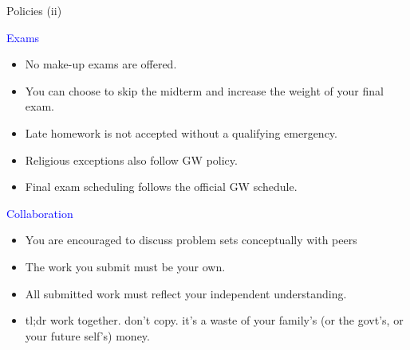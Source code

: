 \documentclass[notes,11pt, aspectratio=169, xcolor=table]{beamer}
\newcommand{\blue}[1]{\textcolor{blue}{#1}}
\newenvironment{wideitemize}{\itemize\addtolength{\itemsep}{10pt}}{\enditemize}
\begin{document}
\begin{frame}{Policies (ii)}

\begin{wideitemize}
    \item \blue{Exams}
    \begin{itemize}
        \item No make-up exams are offered.
        \item You can choose to skip the midterm and increase the weight of your final exam.
        \item Late homework is not accepted without a qualifying emergency.
        \item Religious exceptions also follow GW policy.
        \item Final exam scheduling follows the official GW schedule.
    \end{itemize}
    \item<2-> \blue{Collaboration}
    \begin{itemize}
        \item You are encouraged to discuss problem sets conceptually with peers
        \item The work you submit must be your own.
        \item All submitted work must reflect your independent understanding.
        \item tl;dr work together. don't copy. it's a waste of your family's (or the govt's, or your future self's) money.
    \end{itemize}

\smallskip



\end{wideitemize}
    
\end{frame}
\end{document}
